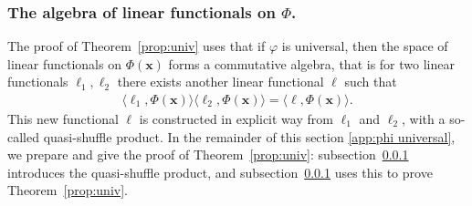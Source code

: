 \documentclass{article} \usepackage{iclr2021_conference,times}
\newcommand{\bx}{\mathbf{x}}
\theoremstyle{plain}
\theoremstyle{definition}
\begin{document}
\subsubsection{The algebra of linear functionals on $ \Phi $.}\label{app:quasi} 
The proof of Theorem~\ref{prop:univ} uses that if $ \varphi $ is universal, then the space of linear functionals on $ \Phi(\bx) $ forms a commutative algebra, that is for two linear functionals $\ell_1,\ell_2$ there exists another linear functional $\ell$ such that
\begin{align}
  \langle \ell_1,\Phi(\bx) \rangle \langle \ell_2,\Phi(\bx) \rangle =  \langle \ell,\Phi(\bx) \rangle. 
\end{align}
This new functional $\ell$ is constructed in explicit way from $\ell_1$ and $\ell_2$, with a so-called quasi-shuffle product.
In the remainder of this section \ref{app:phi universal}, we prepare and give the proof of Theorem~\ref{prop:univ}: subsection~\ref{app:quasi} introduces the quasi-shuffle product, and subsection~\ref{app:quasi} uses this to prove Theorem~\ref{prop:univ}.     
\end{document}
